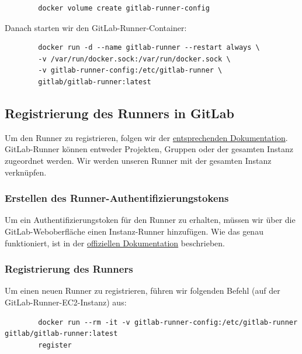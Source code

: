 \documentclass[a4paper,12pt]{article}
\begin{document}
\begin{verbatim}
		docker volume create gitlab-runner-config
\end{verbatim}

Danach starten wir den GitLab-Runner-Container:

\begin{verbatim}
		docker run -d --name gitlab-runner --restart always \
		-v /var/run/docker.sock:/var/run/docker.sock \
		-v gitlab-runner-config:/etc/gitlab-runner \
		gitlab/gitlab-runner:latest
\end{verbatim}

\subsection{Registrierung des Runners in GitLab}
Um den Runner zu registrieren, folgen wir der \href{https://docs.gitlab.com/runner/register/index.html}{entsprechenden Dokumentation}.  
GitLab-Runner können entweder Projekten, Gruppen oder der gesamten Instanz zugeordnet werden.  
Wir werden unseren Runner mit der gesamten Instanz verknüpfen.

\subsubsection{Erstellen des Runner-Authentifizierungstokens}
Um ein Authentifizierungstoken für den Runner zu erhalten, müssen wir über die GitLab-Weboberfläche einen Instanz-Runner hinzufügen.  
Wie das genau funktioniert, ist in der \href{https://docs.gitlab.com/17.6/ee/ci/runners/runners_scope.html#create-an-instance-runner-with-a-runner-authentication-token}{offiziellen Dokumentation} beschrieben.

\subsubsection{Registrierung des Runners}
Um einen neuen Runner zu registrieren, führen wir folgenden Befehl (auf der GitLab-Runner-EC2-Instanz) aus:

\begin{verbatim}
		docker run --rm -it -v gitlab-runner-config:/etc/gitlab-runner gitlab/gitlab-runner:latest
		register
\end{verbatim}
\end{document}
